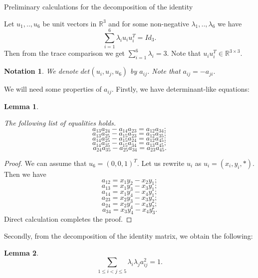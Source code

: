 \documentclass[12pt]{article}
\newtheorem{lemma}{Lemma}[section]
\newtheorem{notation}{Notation}[section]
\begin{document}
\begin{section}{Preliminary calculations for the decomposition of the identity }

    Let $u_{1},..,u_{6}$ be unit vectors in $\mathbb{R}^{3}$ and for some non-negative 
    $\lambda_{1},..,\lambda_{6}$ we have 
    $$
        \sum_{i=1}^{6}\lambda_{i}u_{i}u_{i}^{T} = Id_{3}.
    $$    
Then from the trace comparison we get $\sum_{i=1}^{6} \lambda_{i} = 3.$ Note that $u_{i}u_{i}^{T}\in \mathbb{R}^{3\times 3}.$
    
    \begin{notation}
        We denote $det(u_{i},u_{j},u_{6})$ by $a_{ij}$. Note that $a_{ij} = -a_{ji}.$
    \end{notation}

    We will need some properties of $a_{ij}$. Firstly, we have determinant-like equations:
    
    \begin{lemma}
    \label{det-like}
        
    The following list of equalities holds.
        $$
            a_{13}a_{24} - a_{14}a_{23} = a_{12}a_{34};
        $$
        $$
            a_{13}a_{25} - a_{15}a_{23} = a_{12}a_{35};
        $$
        $$
            a_{14}a_{25} - a_{15}a_{24} = a_{12}a_{45};
        $$
        $$
            a_{14}a_{35} - a_{15}a_{34} = a_{13}a_{45};
        $$
        $$
            a_{24}a_{35} - a_{25}a_{34} = a_{23}a_{45}.
        $$
    \end{lemma}

    \begin{proof}
       We can assume that $u_{6} = (0,0,1)^{T}$. Let us rewrite $u_{i}$ as $ u_{i} = (x_{i},y_{i},*).$
        Then we have
        $$
            a_{12} = x_{1}y_{2}-x_{2}y_{1}; 
        $$
        $$
            a_{13} = x_{1}y_{3}-x_{3}y_{1};
        $$
        $$
            a_{14} = x_{1}y_{4}-x_{4}y_{1};
        $$
        $$
            a_{23} = x_{2}y_{3}-x_{3}y_{2};
        $$
         $$
            a_{24} = x_{2}y_{4}-x_{4}y_{2};
        $$
        $$
            a_{34} = x_{3}y_{4}-x_{4}y_{3}.
        $$
        Direct calculation completes the proof.
    \end{proof}

    Secondly, from the decomposition of the identity matrix, we obtain the following:

    \begin{lemma}
    \label{id-cor}
        $$
            \sum_{1\leq i<j\leq 5} \lambda_{i}\lambda_{j}a_{ij}^2= 1.
        $$
    \end{lemma}
    

\end{section}
\end{document}
